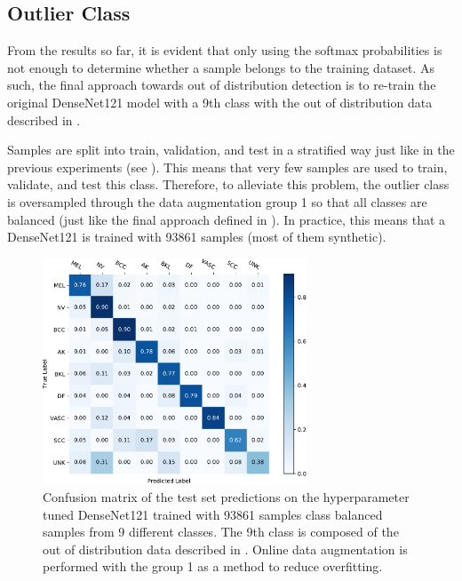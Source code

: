     \subsection{Outlier Class}
        From the results so far, it is evident that only using the softmax probabilities is not enough to determine whether a sample belongs to the training dataset. As such, the final approach towards out of distribution detection is to re-train the original DenseNet121 model with a 9th class with the out of distribution data described in . \par
        
        Samples are split into train, validation, and test in a stratified way just like in the previous experiments (see ). This means that very few samples are used to train, validate, and test this class. Therefore, to alleviate this problem, the outlier class is oversampled through the data augmentation group 1 so that all classes are balanced (just like the final approach defined in ). In practice, this means that a DenseNet121 is trained with 93861 samples (most of them synthetic). \par
        
        \begin{figure}[ht]
            \centering
            \includegraphics[width=0.7\textwidth]{figs/densenet121_conf_matrix_unknown_train.pdf}
            \caption[Confusion matrix of the test set predictions on the hyperparameter tuned DenseNet121 trained with in and out of distribution samples]{Confusion matrix of the test set predictions on the hyperparameter tuned DenseNet121 trained with 93861 samples class balanced samples from 9 different classes. The 9th class is composed of the out of distribution data described in . Online data augmentation is performed with the group 1 as a method to reduce overfitting.}
            \label{fig:densenet121_conf_matrix_9thclass}
        \end{figure}
        
